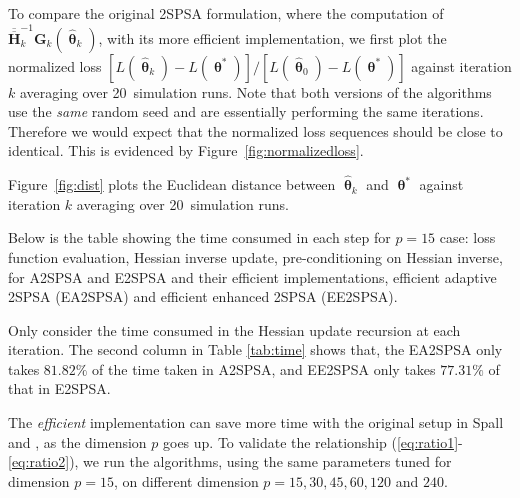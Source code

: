 \documentclass[conference,10.6cpt]{IEEEtran}
\newcommand{\bG}{\bm{G}}
\newcommand{\ooH}{\bm{\overline{\overline{H}}}}
\newcommand{\htheta}{\bm{\hat{\uptheta}}}
\begin{document}
\newcommand{\nruns}[0]{20\ }
To compare the original 2SPSA formulation, where the computation of $\ooH_k^{-1}
\bG_k(\htheta_k)$, with its more efficient
implementation, we first plot the normalized loss
$[L(\htheta_k)-L(\bm{\uptheta}^{*})]/[L(\htheta_0)-L(\bm{\uptheta}^{*})]$
against iteration $k$ averaging over \nruns simulation runs. Note that
both versions of the algorithms use the \textit{same} random seed and
are essentially performing the same iterations. Therefore we would expect
that the normalized loss sequences should be close to identical. This is evidenced by Figure~\ref{fig:normalizedloss}.

Figure~\ref{fig:dist} plots the Euclidean distance between
$\htheta_k$ and $\bm{\uptheta}^{*}$ against iteration $k$ averaging
over \nruns simulation runs.


Below is the table showing the time consumed in each step for $p=15$ case:
loss function evaluation, Hessian inverse update, pre-conditioning on
Hessian inverse, for A2SPSA and E2SPSA and their efficient implementations, efficient adaptive 2SPSA (EA2SPSA) and efficient enhanced 2SPSA (EE2SPSA).

\begin{table}[htbp]
	\centering
		\caption{Time Consumed in Each Procedure for $p=15$}
		\label{tab:time}
	\end{table}

Only consider the time consumed in the Hessian update recursion at each iteration. The second column in Table \ref{tab:time} shows that, the EA2SPSA only takes $81.82\%$ of the time taken in A2SPSA, and EE2SPSA only takes $77.31\%$ of that in E2SPSA.

The \textit{efficient} implementation can save more time with the original setup in Spall \cite{Spall2000} and \cite{Spall2009}, as the dimension $p$ goes up. To validate the relationship (\ref{eq:ratio1}-\ref{eq:ratio2}), we run the algorithms, using the same parameters tuned for dimension $p=15$, on different dimension $p=15,30,45,60,120$ and $240$.
\end{document}
